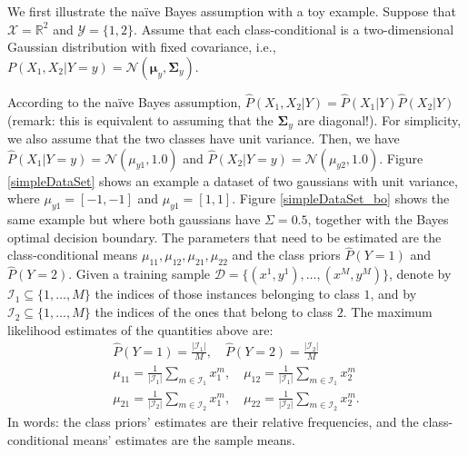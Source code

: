We first illustrate the na\"ive Bayes assumption with a toy example. 
Suppose that $\mathcal{X}=\mathbb{R}^2$ and $\mathcal{Y}=\{1,2\}$. 
Assume that each class-conditional is a two-dimensional Gaussian distribution with fixed covariance, 
i.e., $P(X_1,X_2|Y=y)=\mathcal{N}(\boldsymbol{\mu}_y, \boldsymbol{\Sigma}_y)$. 

According to the na\"ive Bayes assumption, ${\hat P}(X_1,X_2|Y) = {\hat P}(X_1|Y) {\hat P}(X_2|Y)$ (remark: this 
is equivalent to assuming that 
the $\boldsymbol{\Sigma}_y$ are diagonal!). For simplicity, we also assume that the two classes have unit variance. Then, we have 
${\hat P}(X_1|Y=y) = \mathcal{N}(\mu_{y1}, 1.0)$ 
and ${\hat P}(X_2|Y=y) = \mathcal{N}(\mu_{y2}, 1.0)$. Figure
\ref{simpleDataSet} shows an example a dataset of two gaussians with unit
variance, where $\mu_{y1} = [-1,-1]$ and $\mu_{y1} = [1,1]$. Figure
\ref{simpleDataSet_bo} shows the same example but where both
gaussians have $\Sigma = 0.5$, together with the Bayes optimal decision boundary. 
The parameters that need to be estimated are the class-conditional means $\mu_{11},\mu_{12},\mu_{21},\mu_{22}$ and 
the class priors ${\hat P}(Y=1)$ and ${\hat P}(Y=2)$. Given a training sample $\mathcal{D} = \{(x^{1},y^{1}),\ldots,(x^{M},y^{M})\}$, 
denote by $\mathcal{I}_1\subseteq \{1,\ldots,M\}$ the indices of those instances belonging to class $1$, and 
by $\mathcal{I}_2\subseteq \{1,\ldots,M\}$ the indices of the ones that belong to class $2$. 
The maximum likelihood estimates of the quantities above are: 
\begin{eqnarray}
{\hat P}(Y = 1) = \frac{|\mathcal{I}_1|}{M}, \quad 
{\hat P}(Y = 2) = \frac{|\mathcal{I}_2|}{M}\nonumber\\
\mu_{11} = \frac{1}{|\mathcal{I}_1|} \sum_{m \in \mathcal{I}_1} x_1^{m}, \quad
\mu_{12} = \frac{1}{|\mathcal{I}_1|} \sum_{m \in \mathcal{I}_1} x_2^{m}\nonumber\\
\mu_{21} = \frac{1}{|\mathcal{I}_2|} \sum_{m \in \mathcal{I}_2} x_1^{m}, \quad
\mu_{22} = \frac{1}{|\mathcal{I}_2|} \sum_{m \in \mathcal{I}_2} x_2^{m}.
\end{eqnarray}
In words: the class priors' estimates are their relative frequencies, and 
the class-conditional means' estimates are the sample means. 

